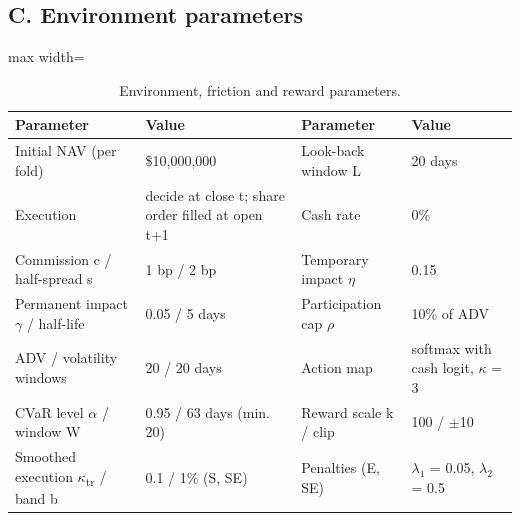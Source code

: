 \documentclass[11pt]{article}
\begin{document}
\subsection{C. Environment parameters}\label{c.-environment-parameters}

\begin{table}[!htbp]
\centering\scriptsize
\caption{Environment, friction and reward parameters.\label{tab-env}}
\begin{adjustbox}{max width=\linewidth}
\begin{tabular}{@{}llll@{}}
\toprule
Parameter & Value & Parameter & Value \\
\midrule
Initial NAV (per fold) & \$10,000,000 & Look-back window L & 20 days \\
Execution & decide at close t; share order filled at open t+1 & Cash rate & 0\% \\
Commission c / half-spread s & 1 bp / 2 bp & Temporary impact $\eta$ & 0.15 \\
Permanent impact $\gamma$ / half-life & 0.05 / 5 days & Participation cap $\rho$ & 10\% of ADV \\
ADV / volatility windows & 20 / 20 days & Action map & softmax with cash logit, $\kappa$ = 3 \\
CVaR level $\alpha$ / window W & 0.95 / 63 days (min. 20) & Reward scale k / clip & 100 / $\pm$10 \\
Smoothed execution $\kappa$\textsubscript{tr} / band b & 0.1 / 1\% (S, SE) & Penalties (E, SE) & $\lambda_1$ = 0.05, $\lambda_2$ = 0.5 \\
\bottomrule
\end{tabular}
\end{adjustbox}
\end{table}
\end{document}
